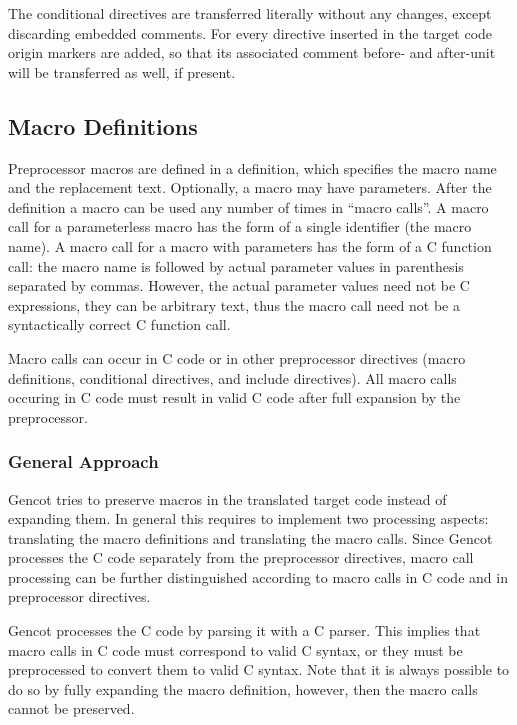 The conditional directives are transferred literally without any changes, except discarding embedded comments. 
For every directive inserted in the target code origin markers are added, so that its associated comment before-
and after-unit will be transferred as well, if present.

\subsection{Macro Definitions}
\label{design-preprocessor-macros}

Preprocessor macros are defined in a definition, which specifies the macro name and the replacement text. Optionally,
a macro may have parameters. After the definition a macro can be used any number of times in ``macro calls''.
A macro call for a parameterless macro has the form of a single identifier (the macro name). A macro call for
a macro with parameters has the form of a C function call: the macro name is followed by actual parameter values
in parenthesis separated by commas. However, the actual parameter values need not be C expressions, they can be 
arbitrary text, thus the macro call need not be a syntactically correct C function call.

Macro calls can occur in C code or in other preprocessor directives (macro definitions, conditional directives, 
and include directives). All macro calls occuring in C code must result in valid C code after full expansion 
by the preprocessor.

\subsubsection{General Approach}

Gencot tries to preserve macros in the translated target code instead of expanding them. In general this requires
to implement two processing aspects: translating the macro definitions and translating the macro calls. Since Gencot
processes the C code separately from the preprocessor directives, macro call processing can be further distinguished
according to macro calls in C code and in preprocessor directives.

Gencot processes the C code by parsing it with a C parser. This implies that macro calls in C code must correspond
to valid C syntax, or they must be preprocessed to convert them to valid C syntax. Note that it is always possible
to do so by fully expanding the macro definition, however, then the macro calls cannot be preserved.

